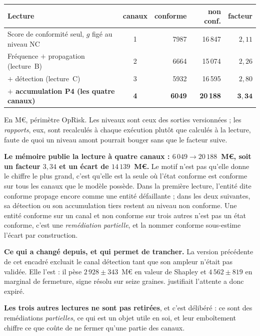 \begin{center}\footnotesize
\renewcommand{\arraystretch}{1.25}
\begin{tabular}{@{}l c r r r@{}}
\toprule
\textbf{Lecture} & \textbf{canaux} & \textbf{conforme} & \textbf{non conf.} & \textbf{facteur} \\
\midrule
Score de conformité seul, $g$ figé au niveau NC & 1 & 7987 & 16\,847 & $2{,}11$ \\
Fréquence $+$ propagation (lecture~B) & 2 & 6664 & 15\,074 & $2{,}26$ \\
$+$ détection (lecture~C) & 3 & 5932 & 16\,595 & $2{,}80$ \\
\textbf{$+$ accumulation P4 (les quatre canaux)} & \textbf{4} & \textbf{6049} & \textbf{20\,188}
& $\mathbf{3{,}34}$ \\
\bottomrule
\end{tabular}
\end{center}

\vspace{4pt}
\noindent En M\euro, périmètre OpRisk. Les niveaux sont ceux des sorties versionnées ; les
\emph{rapports}, eux, sont recalculés à chaque exécution plutôt que
calculés à la lecture, faute de quoi un niveau amont pourrait bouger sans que le facteur suive.

\begin{cle}
\textbf{Le mémoire publie la lecture à quatre canaux : $6\,049 \to 20\,188$~M\euro, soit un
facteur $3{,}34$ et un écart de $14\,139$~M\euro.} Le motif n'est pas qu'elle donne le chiffre
le plus grand, c'est qu'elle est la seule où l'état conforme est conforme sur tous les
canaux que le modèle possède. Dans la première lecture, l'entité dite conforme propage encore
comme une entité défaillante ; dans les deux suivantes, sa détection ou son accumulation tiers
restent au niveau non conforme. Une entité conforme sur un canal et non conforme sur trois autres
n'est pas un état conforme, c'est une \emph{remédiation partielle}, et la nommer conforme
sous-estime l'écart par construction.

\textbf{Ce qui a changé depuis, et qui permet de trancher.} La version précédente de cet encadré
excluait le canal détection tant que son ampleur n'était pas validée. Elle l'est : il pèse
$2\,928 \pm 343$~M\euro{} en valeur de Shapley et
$4\,562 \pm 819$ en marginal de fermeture, signe résolu sur seize graines.
justifiait l'attente a donc expiré.

\textbf{Les trois autres lectures ne sont pas retirées}, et c'est délibéré : ce sont des
remédiations \emph{partielles}, ce qui est un objet utile en soi, et leur emboîtement chiffre ce
que coûte de ne fermer qu'une partie des canaux.
\end{cle}

